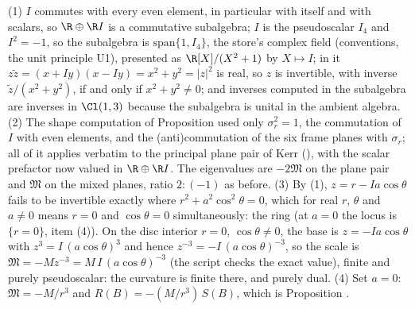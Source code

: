 (1) $I$ commutes with every even element, in particular with itself and with scalars, so $\R \oplus \R I$ is a commutative subalgebra; $I$ is the pseudoscalar $I_4$ and $I^2 = -1$, so the subalgebra is $\mathrm{span}\{1, I_4\}$, the store's complex field (conventions, the unit principle U1), presented as $\R[X]/(X^2 + 1)$ by $X \mapsto I$; in it $z\tilde z = (x + Iy)(x - Iy) = x^2 + y^2 = |z|^2$ is real, so $z$ is invertible, with inverse $\tilde z/(x^2 + y^2)$, if and only if $x^2 + y^2 \neq 0$; and inverses computed in the subalgebra are inverses in $\Cl(1,3)$ because the subalgebra is unital in the ambient algebra. (2) The shape computation of Proposition  used only $\sigma_r^2 = 1$, the commutation of $I$ with even elements, and the (anti)commutation of the six frame planes with $\sigma_r$; all of it applies verbatim to the principal plane pair of Kerr (), with the scalar prefactor now valued in $\R \oplus \R I$. The eigenvalues are $-2\mathfrak M$ on the plane pair and $\mathfrak M$ on the mixed planes, ratio $2 : (-1)$ as before. (3) By (1), $z = r - Ia\cos\theta$ fails to be invertible exactly where $r^2 + a^2\cos^2\theta = 0$, which for real $r$, $\theta$ and $a \neq 0$ means $r = 0$ and $\cos\theta = 0$ simultaneously: the ring (at $a = 0$ the locus is $\{r = 0\}$, item (4)). On the disc interior $r = 0$, $\cos\theta \neq 0$, the base is $z = -Ia\cos\theta$ with $z^3 = I\,(a\cos\theta)^3$ and hence $z^{-3} = -I\,(a\cos\theta)^{-3}$, so the scale is $\mathfrak M = -M z^{-3} = M\,I\,(a\cos\theta)^{-3}$ (the script checks the exact value), finite and purely pseudoscalar: the curvature is finite there, and purely dual. (4) Set $a = 0$: $\mathfrak M = -M/r^3$ and $R(B) = -(M/r^3)\,S(B)$, which is Proposition .
